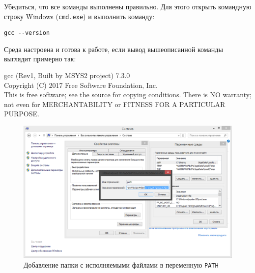 \documentclass[a4paper,oneside,DIV=12,12pt]{scrartcl}
\newcommand{\progname}[1]{\texttt{#1}}
\begin{document}
\begin{steps}[ref={\arabic*}]
				\item Убедиться, что все команды выполнены правильно. Для этого открыть командную строку Windows (\progname{cmd.exe}) и выполнить команду:
				\begin{verbatim}
gcc --version
				\end{verbatim}
				Среда настроена и готова к работе, если вывод вышеописанной команды выглядит примерно так:
				
				{\ttfamily
gcc (Rev1, Built by MSYS2 project) 7.3.0\\
Copyright (C) 2017 Free Software Foundation, Inc.\\
This is free software; see the source for copying conditions.  There is NO
warranty; not even for MERCHANTABILITY or FITNESS FOR A PARTICULAR PURPOSE.}
			\end{steps}
			
			\begin{figure}[!htbp]
			\centering
				\includegraphics[width = \textwidth]{assets/append-to-path.png}
			\caption{Добавление папки с исполняемыми файлами в переменную \texttt{PATH}}
			\label{fig:append-to-path}
			\end{figure}
		
\end{document}
